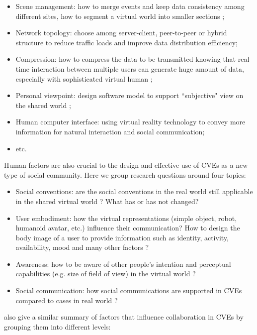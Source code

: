 \begin{itemize}
\item Scene management: how to merge events and keep data consistency among different sites, how to segment a virtual world into smaller sections \citep{Kazman1993Making};
\item Network topology: choose among server-client, peer-to-peer or hybrid structure to reduce traffic loads and improve data distribution efficiency;
\item Compression: how to compress the data to be transmitted knowing that real time interaction between multiple users can generate huge amount of data, especially with sophisticated virtual human \citep{Capin1998Efficient};
\item Personal viewpoint: design software model to support ``subjective" view on the shared world \citep{Smith1996CVE};
\item Human computer interface: using virtual reality technology to convey more information for natural interaction and social communication;
\item etc.
\end{itemize}

Human factors are also crucial to the design and effective use of CVEs as a new type of social community. Here we group research questions around four topics: 

\begin{itemize}
\item Social conventions: are the social conventions in the real world still applicable in the shared virtual world \citep{Becker1998Social}? What has or has not changed?
\item User embodiment: how the virtual representations (simple object, robot, humanoid avatar, etc.) influence their communication? How to design the body image of a user to provide information such as identity, activity, availability, mood and many other factors \citep{Benford1995Embodiment}? 
\item Awareness: how to be aware of other people's intention and perceptual capabilities (e.g. size of field of view) in the virtual world \citep{Benford1994Awareness}?
\item Social communication: how social communications are supported in CVEs compared to cases in real world \citep{Bailenson2006Long}?
\end{itemize}

\citet{Otto2006Review} also give a similar summary of factors that influence collaboration in CVEs by grouping them into different levels:

